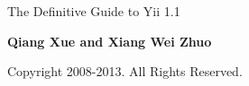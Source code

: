 \thispagestyle{empty}
\begin{center}
		\bfseries \rule{0cm}{1.5cm} \Huge
		The Definitive Guide to Yii 1.1
		 \vspace{1.5cm}
\end{center}

\begin{center}
		\bfseries \Large Qiang Xue and Xiang Wei Zhuo
\end{center}


\begin{center}
	 Copyright 2008-2013. All Rights Reserved.
\end{center}

\vfill

\pagebreak \thispagestyle{empty} \cleardoublepage
